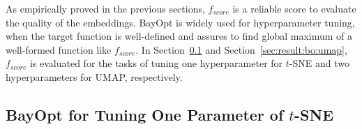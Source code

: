 As empirically proved in the previous sections, $f_{score}$ is a reliable score to evaluate the quality of the embeddings.
BayOpt is widely used for hyperparameter tuning, when the target function is well-defined and assures to find global maximum of a well-formed function like $f_{score}$.
In Section~\ref{sec:result:bo:tsne} and Section~\ref{sec:result:bo:umap}, $f_{score}$ is evaluated for the tasks of tuning one hyperparameter for $t$-SNE and two hyperparameters for UMAP, respectively.

\subsection{BayOpt for Tuning One Parameter of $t$-SNE}\label{sec:result:bo:tsne}

